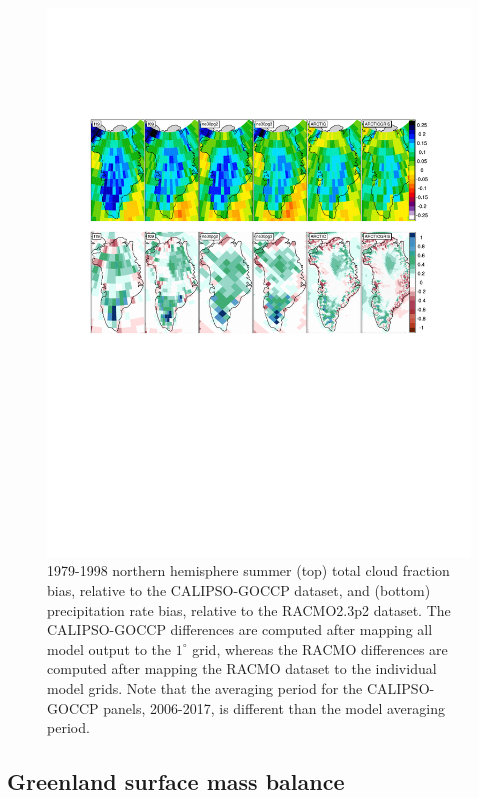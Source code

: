 \documentclass[draft]{agujournal2019}
\begin{document}
\begin{figure}[t]
\begin{center}
         \includegraphics[width=130mm]{figs/temp_contours_diffCERESdiffRACMO_CLOUD_PRECIP.pdf}
\end{center}
\caption{1979-1998 northern hemisphere summer (top) total cloud fraction bias, relative to the CALIPSO-GOCCP dataset, and (bottom) precipitation rate bias, relative to the RACMO2.3p2 dataset. The CALIPSO-GOCCP differences are computed after mapping all model output to the $1^{\circ}$ grid, whereas the RACMO differences are computed after mapping the RACMO dataset to the individual model grids. Note that the averaging period for the CALIPSO-GOCCP panels, 2006-2017, is different than the model averaging period.}
\label{fig:prect}
\end{figure}

\subsection{Greenland surface mass balance}
\end{document}
